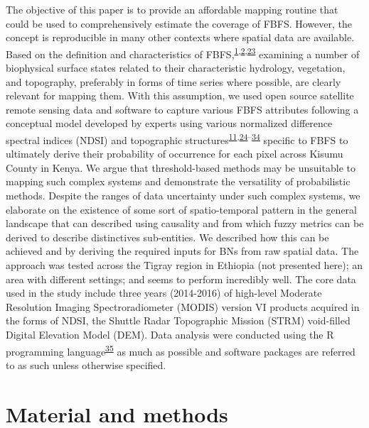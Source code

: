 \documentclass[12pt,oneside]{article}
\begin{document}
The objective of this paper is to provide an affordable mapping routine
that could be used to comprehensively estimate the coverage of FBFS.
However, the concept is reproducible in many other contexts where
spatial data are available. Based on the definition and characteristics
of
FBFS,\textsuperscript{\protect\hyperlink{ref-Puertas_et_al_2011}{1},\protect\hyperlink{ref-VanSteenbergen_et_al_2010}{2},\protect\hyperlink{ref-VanSteenbergen_et_al_2011}{23}}
examining a number of biophysical surface states related to their
characteristic hydrology, vegetation, and topography, preferably in
forms of time series where possible, are clearly relevant for mapping
them. With this assumption, we used open source satellite remote sensing
data and software to capture various FBFS attributes following a
conceptual model developed by experts using various normalized
difference spectral indices (NDSI) and topographic
structures\textsuperscript{\protect\hyperlink{ref-Wegmann_et_al_2016}{11},\protect\hyperlink{ref-Arge_et_al_2003}{24}--\protect\hyperlink{ref-Yang_et_al_2006}{34}}
specific to FBFS to ultimately derive their probability of occurrence
for each pixel across Kisumu County in Kenya. We argue that
threshold-based methods may be unsuitable to mapping such complex
systems and demonstrate the versatility of probabilistic methods.
Despite the ranges of data uncertainty under such complex systems, we
elaborate on the existence of some sort of spatio-temporal pattern in
the general landscape that can described using causality and from which
fuzzy metrics can be derived to describe distinctives sub-entities. We
described how this can be achieved and by deriving the required inputs
for BNs from raw spatial data. The approach was tested across the Tigray
region in Ethiopia (not presented here); an area with different
settings; and seems to perform incredibly well. The core data used in
the study include three years (2014-2016) of high-level Moderate
Resolution Imaging Spectroradiometer (MODIS) version VI products
acquired in the forms of NDSI, the Shuttle Radar Topographic Mission
(STRM) void-filled Digital Elevation Model (DEM). Data analysis were
conducted using the R programming
language\textsuperscript{\protect\hyperlink{ref-RCoreTeam_2018}{35}} as
much as possible and software packages are referred to as such unless
otherwise specified.

\hypertarget{I}{%
\section{Material and methods}\label{I}}
\end{document}
